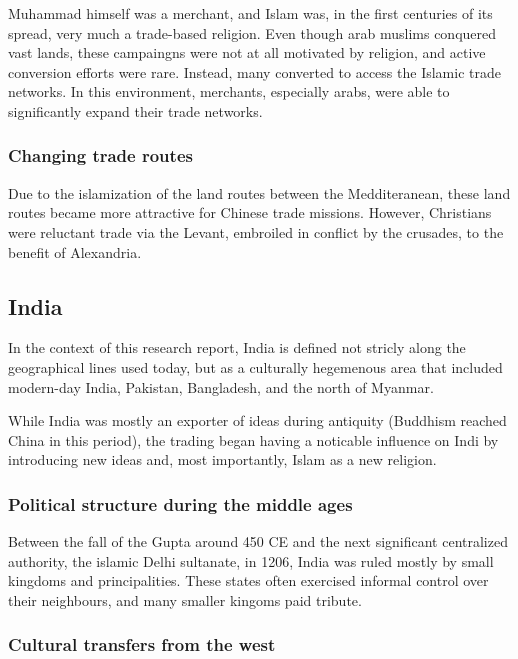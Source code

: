 \documentclass[11pt, a4paper, headings=standardclasses]{scrartcl}
\begin{document}
Muhammad himself was a merchant\autocite{Muhammad}, and Islam was, in the first centuries of its spread, very much a trade-based religion. Even though arab muslims conquered vast lands, these campaingns were not at all motivated by religion\autocite[200]{Lapidus}, and active conversion efforts were rare. Instead, many converted to access the Islamic trade networks.\autocite{SilkRoadIslam} In this environment, merchants, especially arabs, were able to significantly expand their trade networks.

\subsubsection{Changing trade routes}

Due to the islamization of the land routes between the Medditeranean, these land routes became more attractive for Chinese trade missions. However, Christians were reluctant trade via the Levant, embroiled in conflict by the crusades, to the benefit of Alexandria.\autocite[Paragraph 5]{UN}

\subsection{India}

In the context of this research report, India is defined not stricly along the geographical lines used today, but as a culturally hegemenous area that included modern-day India, Pakistan, Bangladesh, and the north of Myanmar.

While India was mostly an exporter of ideas during antiquity (Buddhism reached China in this period\autocite{SilkRoadIslam}), the trading began having a noticable influence on Indi by introducing new ideas and, most importantly, Islam as a new religion.

\subsubsection{Political structure during the middle ages}

Between the fall of the Gupta around 450 CE\autocite[Section \textit{Gupta}]{India} and the next significant centralized authority, the islamic Delhi sultanate, in 1206\autocite{Delhi}, India was ruled mostly by small kingdoms and principalities. These states often exercised informal control over their neighbours, and many smaller kingoms paid tribute.\autocite{India}

\subsubsection{Cultural transfers from the west}
\end{document}

